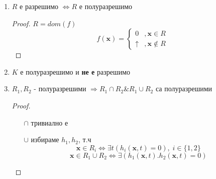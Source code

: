 \begin{corollary}
\begin{enumerate}
\begin{proof}
\begin{itemize}
            Тогава:
            \begin{equation*}
                x \in range(g) \iff x \in dom(f)
            \end{equation*}
            \item[($\Leftarrow$)] $x \in range(g), g: \subseteq \N \to \N$ е изчислима

            избираме $h: \N^3 \to N$ е примитивно рек, т.ч.
            \begin{equation*}
                g(x) = y \iff \exists z ( h(x, y, z) = 0 )
            \end{equation*}
            \begin{equation*}
                y \in R \iff \exists x g(x) = y \iff \exists x \exists z h(x, y, z) = 0 \iff \exists t ( h((t)_0, y, (t)_1) = 0 )
            \end{equation*}
            $R$ е полуразрашимо от горното
        \end{itemize}
        \end{proof}
        \item $R$ е разрешимо $\iff R$ е полуразрешимо
        
        \begin{proof}
            $R = dom(f)$
            \begin{equation*}
                f(\textbf{x}) = \begin{cases}
                    0 &, \textbf{x} \in R \\
                    \uparrow &, \textbf{x} \notin R
                \end{cases}
            \end{equation*}
        \end{proof}
        \item $K$ е полуразрешимо и \textbf{не е} разрешимо
        \item $R_1, R_2$ - полуразрешими $\Rightarrow R_1 \cap R_2 \& R_1 \cup R_2$ са полуразрешими
        
        \begin{proof}
            \begin{itemize}
                \item[$\cap$] тривиално е
                \item[$\cup$] избираме $h_1, h_2$, т.ч
                \begin{equation*}
                    \textbf{x} \in R_i \iff \exists t ( h_i(\textbf{x}, t) = 0 ),\; i \in \{1, 2\}
                \end{equation*}
                \begin{equation*}
                    \textbf{x} \in R_1 \cup R_2 \iff \exists ( h_1( \textbf{x}, t ).h_2(\textbf{x}, t) = 0 )
                \end{equation*}
            \end{itemize}
        \end{proof}
    \end{enumerate}
\end{corollary}

